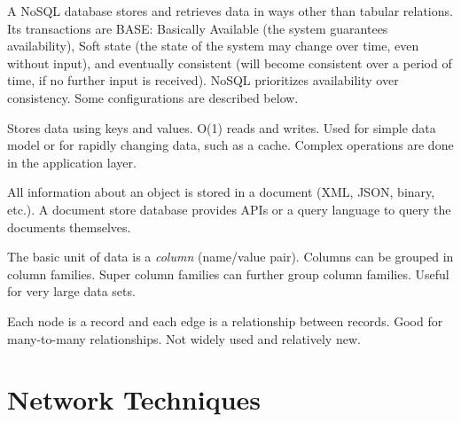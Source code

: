 \begin{description}
\begin{description}[7mm]
    \end{description}
	
    \item[NoSQL] A NoSQL database stores and retrieves data in ways other than tabular relations. Its transactions are BASE: Basically Available (the system guarantees availability), Soft state (the state of the system may change over time, even without input), and eventually consistent (will become consistent over a period of time, if no further input is received). NoSQL prioritizes availability over consistency. Some configurations are described below.
    \begin{description}[7mm]
	\item[Key-value store] Stores data using keys and values. O(1) reads and writes. Used for simple data model or for rapidly changing data, such as a cache. Complex operations are done in the application layer.
	\item[Document store] All information about an object is stored in a document (XML, JSON, binary, etc.). A document store database provides APIs or a query language to query the documents themselves.
	\item[Wide column store] The basic unit of data is a \textit{column} (name/value pair). Columns can be grouped in column families. Super column families can further group column families. Useful for very large data sets.
	\item[Graph database] Each node is a record and each edge is a relationship between records. Good for many-to-many relationships. Not widely used and relatively new.
    \end{description}
\end{description}

\section{Network Techniques}

